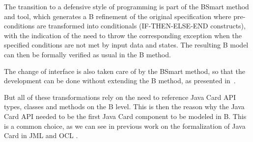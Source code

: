 \documentclass{llncs}
\begin{document}
The transition to a defensive style of programming is part of the
BSmart method and tool, which generates a B refinement of the original
specification where pre-conditions are transformed into conditionals
(IF-THEN-ELSE-END constructs), with the indication of the need to
throw the corresponding exception when the specified conditions are
not met by input data and states.  The resulting B model can then be
formally verified as usual in the B method.

The change of interface is also taken care of by the BSmart method, so
that the development can be done without extending the B
method, as presented in~\cite{Gomes10}.

But all of these transformations rely on the need to reference Java
Card API types, classes and methods on the B level.  This is then the
reason why the Java Card API needed to be the first Java Card
component to be modeled in B. This is a common choice, as we can see
in previous work on the formalization of Java Card in JML
\cite{pollBerg01} and OCL \cite{Larsson:2004}.
\end{document}
